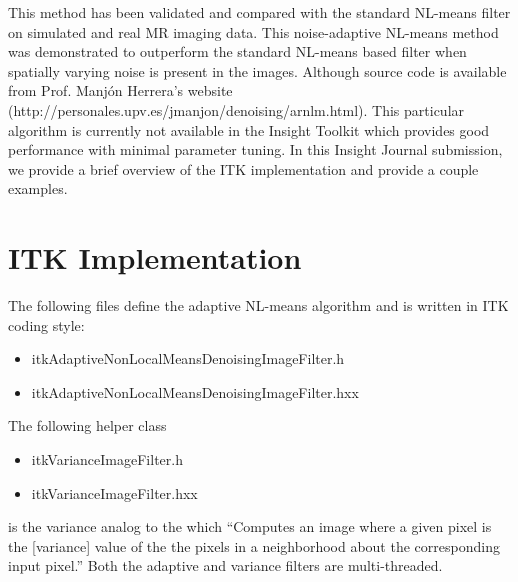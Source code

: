 \documentclass{InsightArticle}
\begin{document}
This method has been validated and compared with the standard NL-means filter on simulated
and real MR imaging data. This noise-adaptive NL-means method was demonstrated to outperform
the standard NL-means based filter when spatially varying noise is present in the images.
Although source code is available from Prof. Manj\'on Herrera's website
(http://personales.upv.es/jmanjon/denoising/arnlm.html).  This particular algorithm is
currently not available in the Insight Toolkit which provides good performance with minimal
parameter tuning. In this Insight Journal submission, we provide a brief overview of the ITK
implementation and provide a couple examples.

\section{ITK Implementation}

The following files define the adaptive NL-means algorithm and is written in ITK
coding style:
\begin{itemize}
  \item itkAdaptiveNonLocalMeansDenoisingImageFilter.h
  \item itkAdaptiveNonLocalMeansDenoisingImageFilter.hxx
\end{itemize}
The following helper class
\begin{itemize}
  \item itkVarianceImageFilter.h
  \item itkVarianceImageFilter.hxx
\end{itemize}
is the variance analog to the  which ``Computes an image where a
given pixel is the [variance] value of the the pixels in a neighborhood about the corresponding
input pixel.''  Both the adaptive and variance filters are multi-threaded.
\end{document}
